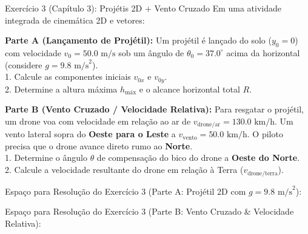 \documentclass[10pt,a4paper]{article}
\begin{document}
\begin{problembox}{Exercício 3 (Capítulo 3): Projétis 2D + Vento Cruzado}
Em uma atividade integrada de cinemática 2D e vetores:

\textbf{Parte A (Lançamento de Projétil):} Um projétil é lançado do solo ($y_0 = 0$) com velocidade $v_0 = 50.0\text{ m/s}$ sob um ângulo de $\theta_0 = 37.0^\circ$ acima da horizontal (considere $g = 9.8\text{ m/s}^2$).\\
1. Calcule as componentes iniciais $v_{0x}$ e $v_{0y}$.\\
2. Determine a altura máxima $h_{\text{máx}}$ e o alcance horizontal total $R$.

\textbf{Parte B (Vento Cruzado / Velocidade Relativa):} Para resgatar o projétil, um drone voa com velocidade em relação ao ar de $v_{\text{drone/ar}} = 130.0\text{ km/h}$. Um vento lateral sopra do \textbf{Oeste para o Leste} a $v_{\text{vento}} = 50.0\text{ km/h}$. O piloto precisa que o drone avance direto rumo ao \textbf{Norte}.\\
1. Determine o ângulo $\theta$ de compensação do bico do drone a \textbf{Oeste do Norte}.\\
2. Calcule a velocidade resultante do drone em relação à Terra ($v_{\text{drone/terra}}$).
\end{problembox}

\begin{solutionarea}{Espaço para Resolução do Exercício 3 (Parte A: Projétil 2D com $g = 9.8\text{ m/s}^2$):}
    \vspace{7.2cm}
\end{solutionarea}

\vspace{4pt}

\begin{solutionarea}{Espaço para Resolução do Exercício 3 (Parte B: Vento Cruzado \& Velocidade Relativa):}
    \vspace{7.2cm}
\end{solutionarea}
\end{document}
